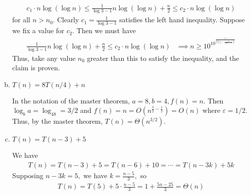 \documentclass{article}
\begin{document}
\begin{enumerate}[(a)]
\begin{soln}
			\begin{align*}
				c_1\cdot n\log(\log n)\le \frac{1}{\log3-1}n\log(\log n) + \frac{n}{2} \le c_2\cdot n\log(\log n)
			\end{align*}
			for all $n>n_0.$ Clearly $c_1=\frac{1}{\log 3-1}$ satisfies the left hand inequality. Suppose we fix a value for $c_2.$ Then we must have
			\begin{align*}
				\frac{1}{\log 3 -1}n\log(\log n)+\frac{n}{2} \le c_2\cdot n\log(\log n) &\implies n\ge 10^{10^{\frac{1}{2\left( c_2-\frac{1}{\log 3 -1} \right)}}}
			\end{align*}
			Thus, take any value $n_0$ greater than this to satisfy the inequality, and the claim is proven.
		\end{soln}

	\item $T(n)=8T(n/4) + n$
		\begin{soln}
			In the notation of the master theorem, $a=8, b=4, f(n)=n.$ Then $\log_ba=\log_48=3/2$ and $f(n)=n=O\left(n^{\frac{3}{2} - \frac{1}{2}}\right) = O(n)$ where $\varepsilon=1/2.$ Thus, by the master theorem, $T(n)=\Theta(n^{3/2}).$
		\end{soln}

	\item $T(n) = T(n-3) + 5$
		\begin{soln}
			We have
			\begin{align*}
				T(n) = T(n-3) + 5 = T(n-6) + 10 = \cdots = T(n-3k) + 5k
			\end{align*}
			Supposing $n-3k=5,$ we have $k=\frac{n-5}{3},$ so
			\begin{align*}
				T(n) = T(5) + 5\cdot \frac{n-5}{3} = 1 + \frac{5n-25}{3} = \Theta(n)
			\end{align*}
		\end{soln}


\end{enumerate}
\end{document}
